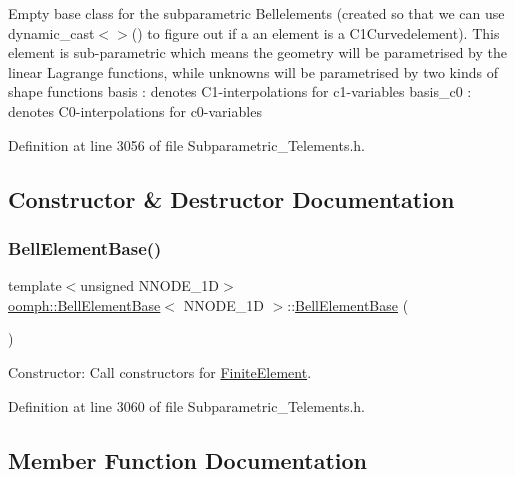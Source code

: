 Empty base class for the subparametric Bellelements (created so that we can use dynamic\+\_\+cast$<$$>$() to figure out if a an element is a C1\+Curvedelement). This element is sub-\/parametric which means the geometry will be parametrised by the linear Lagrange functions, while unknowns will be parametrised by two kinds of shape functions basis \+: denotes C1-\/interpolations for c1-\/variables basis\+\_\+c0 \+: denotes C0-\/interpolations for c0-\/variables 

Definition at line 3056 of file Subparametric\+\_\+\+Telements.\+h.



\subsection{Constructor \& Destructor Documentation}
\mbox{\label{classoomph_1_1BellElementBase_a79c5e60fb98c9e69b096ed84b3430376}} 
\subsubsection{\texorpdfstring{Bell\+Element\+Base()}{BellElementBase()}}
{\footnotesize\ttfamily template$<$unsigned N\+N\+O\+D\+E\+\_\+1D$>$ \\
\hyperlink{classoomph_1_1BellElementBase}{oomph\+::\+Bell\+Element\+Base}$<$ N\+N\+O\+D\+E\+\_\+1D $>$\+::\hyperlink{classoomph_1_1BellElementBase}{Bell\+Element\+Base} (\begin{DoxyParamCaption}{ }\end{DoxyParamCaption})\hspace{0.3cm}{\ttfamily [inline]}}



Constructor\+: Call constructors for \hyperlink{classoomph_1_1FiniteElement}{Finite\+Element}. 



Definition at line 3060 of file Subparametric\+\_\+\+Telements.\+h.



\subsection{Member Function Documentation}
\mbox{\label{classoomph_1_1BellElementBase_aee9266910010dcfca375fe0de13c17bb}} 
